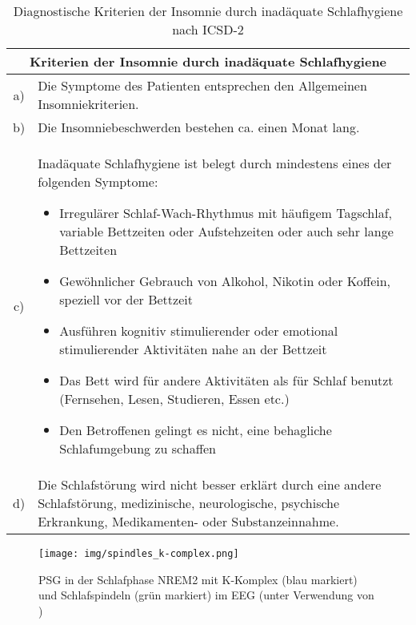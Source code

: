 \begin{table}[H] 
\centering
\begin{tabularx}{\textwidth}{cX}
\toprule
\multicolumn{2}{c}{\textbf{Kriterien der Insomnie durch inadäquate Schlafhygiene}}\\
\midrule 
a) & Die Symptome des Patienten entsprechen den Allgemeinen Insomniekriterien.\\
b) & Die Insomniebeschwerden bestehen ca. einen Monat lang.\\
c) & Inadäquate Schlafhygiene ist belegt durch mindestens eines der folgenden Symptome:
\begin{itemize}
\singlespacing
\setlength\itemsep{0em}
\item Irregulärer Schlaf-Wach-Rhythmus mit häufigem Tagschlaf, variable Bettzeiten oder Aufstehzeiten oder auch sehr lange Bettzeiten
\item Gewöhnlicher Gebrauch von Alkohol, Nikotin oder Koffein, speziell vor der Bettzeit
\item Ausführen kognitiv stimulierender oder emotional stimulierender Aktivitäten nahe an der Bettzeit
\item Das Bett wird für andere Aktivitäten als für Schlaf benutzt (Fernsehen, Lesen, Studieren, Essen etc.)
\item Den Betroffenen gelingt es nicht, eine behagliche Schlafumgebung zu schaffen
\end{itemize}\\
d) & Die Schlafstörung wird nicht besser erklärt durch eine andere Schlafstörung, medizinische, neurologische, psychische Erkrankung, Medikamenten- oder Substanzeinnahme.\\
\bottomrule
\end{tabularx}
\caption[Kriterien der Insomnie durch inadäquate Schlafhygiene]{Diagnostische Kriterien der Insomnie durch inadäquate Schlafhygiene nach \acs{ICSD-2} \parencite{mayer_s3-leitlinie_2009}}
\label{tab:schlafhygiene_insomnie}
\end{table}




\begin{figure}[H]
	\centering
	\texttt{[image: img/spindles\_k-complex.png]}
	\caption[Schlafspinden und K-Komplexe]{\acs{PSG} in der Schlafphase \acs{NREM}2 mit K-Komplex (blau markiert) und Schlafspindeln (grün markiert) im \acs{EEG} (unter Verwendung von \parencite{lee-chiong_sleep_2008})}
	\label{fig:spindel_k-komplex}
\end{figure}


